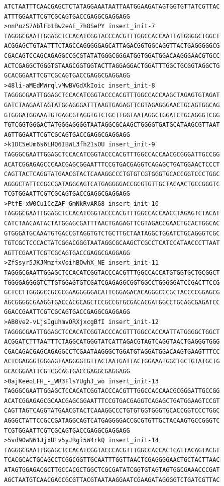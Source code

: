 \documentclass[11pt]{article}
\begin{document}
\begin{verbatim}
ATCTAATTTCAACGAGCTCTATAGGAAATAATTAATGGAAGATAGTGGTGTTATCGTTAC
ATTTGGAATTCGTCGCAGTGACCGAGGCGAGGAGG
>nnPuzS7AblFb1Bw2eAE_7h8SePY insert_init-7
TAGGGCGAATTGGAGCTCCACATCGGTACCCACGTTTGGCCACCAATTATGGGGCTGGCT
ACGGAGCTGTAATTTCTAGCCAGGGGGAGCATTAGACGGTGGCAGGTTACTGAGGGGGCG
CGACAGTCCAGCAGAGGCCGCGTATATGGGCGGGATGGTGGATGGACAAGGGAACGTGCC
ACTCGAGGCTGGGTGTAAGCGGTGGTACTTAGGAGGACTGGATTTGGCTGCGGTAGGCTG
GCACGGAATTCGTCGCAGTGACCGAGGCGAGGAGG
>48li-aMEdMWrqlvMwBVGdXkIoic insert_init-8
TAGGGCGAATTGGAGCTCCACATCGGTACCCACGTTTGGCCACCAAGCTAGAGTGTAGAT
GATCTAAGAATAGTATGGAGGGATTTAAGTGAGAGTTCGTAGAGGGAACTGCAGTGGCAG
GTGGGATGGAAATGTGAGCGTAGGTGTCTGCTTGGTAATAGGCTGGATCTGCAGGGTCGG
TGTCGGTGGGACTATGGGAGGGGTAATAGGCGCAAGCTGGGGTGATGCATAAGCGTTAAT
AGTTGGAATTCGTCGCAGTGACCGAGGCGAGGAGG
>k1DC5eUm6s6LHQ6IBWL3fh21sOU insert_init-9
TAGGGCGAATTGGAGCTCCACATCGGTACCCACGTTTGGCCACCAACGCGGGATTGCCGG
ACATCGGAGAGCCCAACGAGCGGAATTTCCGTGACGAGGTCAGAGCTGATGGAACTCCCT
CAGTTACTCAGGTATGAACGTACTCAAAGGCCCTGTGTCGTGGGTGCACCGGTCCCTGGC
AGGGCTATTCCGCCGATAGGCAGTCATGAGGGGACCGCGTGTTGCTACAACTGCCGGGTC
TCGTGGAATTCGTCGCAGTGACCGAGGCGAGGAGG
>PtfE-xW0Cu1CcZAF_GmNkRvARG8 insert_init-10
TAGGGCGAATTGGAGCTCCACATCGGTACCCACGTTTGGCCACCAACCTAGAGTCTACAT
CATCTAACAATACTATGGAGCGATTTAACTGAGAGTTCGTAGACCGAACTGCACTGGCAC
GTGGGATGCAAATGTGACCGTAGGTGTCTGCTTGCTAATAGGCTGGATCTGCAGGGTCGC
TGTCGCTCCCACTATCGGACGGGTAATAGGCGCAAGCTCGCCTCATCCATAACCCTTAAT
AGTTCGAATTCGTCGCAGTGACCGAGGCGAGGAGG
>ZfSsyr5JKJMmzfxVoihBQwhX_NE insert_init-11
TAGGGCGAATTGGAGCTCCACATCGGTACCCACGTTTGGCCACCATGTGGTGCTGCGGCT
TGGGGAGGGGTCTTGTGGAGTGTCGATCGAGAGGCGGTGGCCTGGGGGATCCGACTTCCG
GCTCCTTGGGGCCGCGCGAAGGGGGACATTCGGAGACACAGGGCCCGCTACCCCGGAGCG
AGCGGGGCGAAGGTGACCACGCAGCTCCGCCGTGCGACACGATGGCCTGCAGCGAGATCC
GGACCGAATTCGTCGCAGTGACCGAGGCGAGGAGG
>AB0ve2-vLjsIguhmvORXjxcgBfI insert_init-12
TAGGGCGAATTGGAGCTCCACATCGGTACCCACGTTTGGCCACCAATTATGGGGCTGGCT
ACGGATCTTTAATTTCTAGGCATGGGTATCATTAGACGTAGTCAGGTAACTGAGGGTGGG
CGACAGACGAGCAGAGGCCTCGAATAAGGGCTGGATGTAGGATGGACAAGTGAAGTTTCC
ACTCGAGGGTGGGAGTAAGGGGTGTTACTAATGATTACTGGAAATGGCTGCTGTATGCTG
GCACGGAATTCGTCGCAGTGACCGAGGCGAGGAGG
>0ajKeeoLFH_-_WR3FlsYUghJ_wo insert_init-13
TAGGGCGAATTGGAGCTCCACATCGGTACCCACGTTTGGCCACCAACGCGGGATTGCCGG
ACATCGGAGAGCGCAACGAGCGGAATTTCCGTGACGAGGTCAGAGCTGATGGAAGTCCGT
CAGTTAGTCAGGTATGAACGTACTCAAAGGCCCTGTGTGGTGGGTGCACCGGTCCCTGGC
AGGGCTATTCCGCCGATAGGCAGTCATGAGGGGACCGCGTGTTGCTACAAGTGCCGGGTC
TCGTGGAATTCGTCGCAGTGACCGAGGCGAGGAGG
>5vd9OwN61JjxUtv5yJRgi5W4rkQ insert_init-14
TAGGGCGAATTGGAGCTCCACATCGGTACCCACGTTTGGCCACCACTCATTACAGTACGT
TCACGCACTGCAGCCTCGGCGGTTGCAATTTGGTTAACTCGAGGGGAACTGCTACTTAAC
ATAGTGGAGACGCTTGCCACGCTGGCTCGCGATATCGGTGTAGTAGTGGCGAAACCCGAT
AGCTAATGTCAACGACCGCGTTACGTAATAAGGAATCGAAGATAGGGGTCTGATCGTTAC

\end{verbatim}
\end{document}
